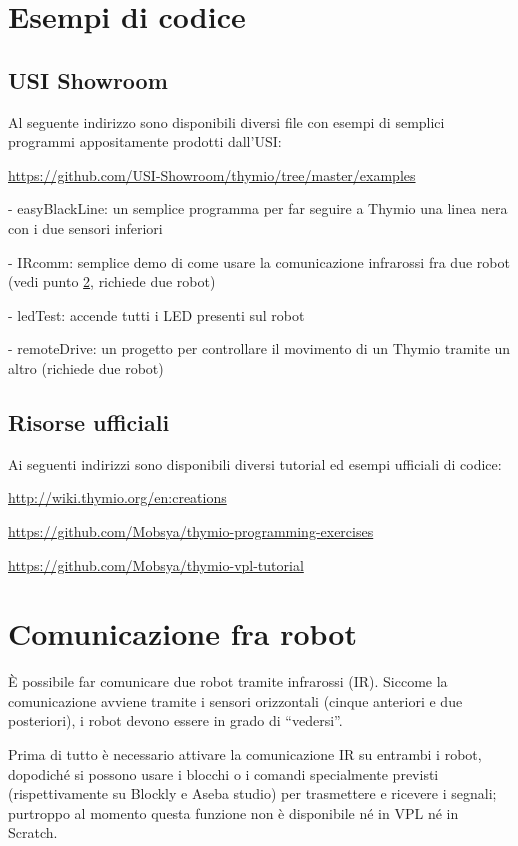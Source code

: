 \documentclass[12pt]{article}
\begin{document}
		
\section{Esempi di codice}

	\subsection{USI Showroom}\label{usiRepo}
		
		Al seguente indirizzo sono disponibili diversi file con esempi di semplici programmi appositamente prodotti dall'USI:
		
		\url{https://github.com/USI-Showroom/thymio/tree/master/examples}
		
		
		- easyBlackLine: un semplice programma per far seguire a Thymio una linea nera con i due sensori inferiori
		
		- IRcomm: semplice demo di come usare la comunicazione infrarossi fra due robot (vedi punto \ref{network}, richiede due robot)
		
		- ledTest: accende tutti i LED presenti sul robot
		
		- remoteDrive: un progetto per controllare il movimento di un Thymio tramite un altro (richiede due robot)
		
	
	\subsection{Risorse ufficiali}
	
		Ai seguenti indirizzi sono disponibili diversi tutorial ed esempi ufficiali di codice:
	
		\url{http://wiki.thymio.org/en:creations}
		
		\url{https://github.com/Mobsya/thymio-programming-exercises}
		
		\url{https://github.com/Mobsya/thymio-vpl-tutorial}
	
	
\section{Comunicazione fra robot}\label{network}

	È possibile far comunicare due robot tramite infrarossi (IR). Siccome la comunicazione avviene tramite i sensori orizzontali (cinque anteriori e due posteriori), i robot devono essere in grado di ``vedersi''.
	
	Prima di tutto è necessario attivare la comunicazione IR su entrambi i robot, dopodiché si possono usare i blocchi o i comandi specialmente previsti (rispettivamente su Blockly e Aseba studio) per trasmettere e ricevere i segnali; purtroppo al momento questa funzione non è disponibile né in VPL né in Scratch.
	
\end{document}
